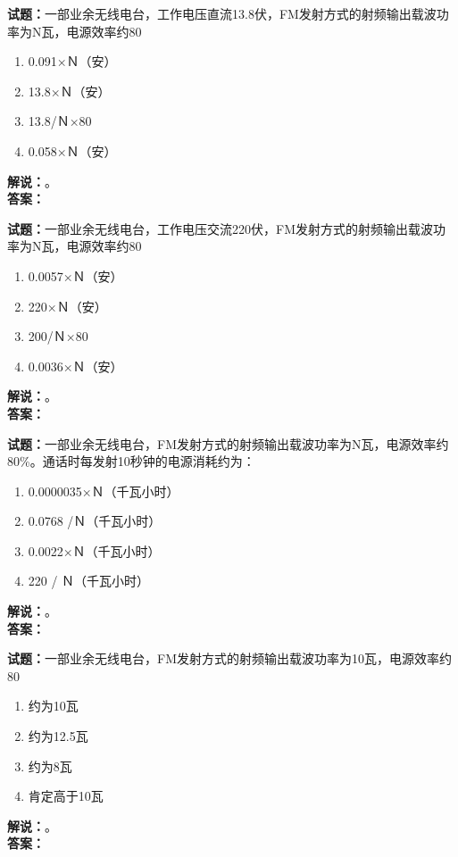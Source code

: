 \documentclass{ctexbook}
\begin{document}
\noindent\textbf{试题：}一部业余无线电台，工作电压直流13.8伏，FM发射方式的射频输出载波功率为N瓦，电源效率约80%
\begin{enumerate}[leftmargin=3em]
  \item 0.091×Ｎ（安）
  \item 13.8×Ｎ（安）
  \item 13.8/Ｎ×80%
  \item 0.058×Ｎ（安）
\end{enumerate}
\noindent\textbf{解说：}\textbf{}。\\\noindent\textbf{答案：}

\vspace{\baselineskip}

\noindent\textbf{试题：}一部业余无线电台，工作电压交流220伏，FM发射方式的射频输出载波功率为N瓦，电源效率约80%
\begin{enumerate}[leftmargin=3em]
  \item 0.0057×Ｎ（安）
  \item 220×Ｎ（安）
  \item 200/Ｎ×80%
  \item 0.0036×Ｎ（安）
\end{enumerate}
\noindent\textbf{解说：}\textbf{}。\\\noindent\textbf{答案：}

\vspace{\baselineskip}

\noindent\textbf{试题：}一部业余无线电台，FM发射方式的射频输出载波功率为N瓦，电源效率约80\%。通话时每发射10秒钟的电源消耗约为：
\begin{enumerate}[leftmargin=3em]
  \item 0.0000035×Ｎ（千瓦小时）
  \item 0.0768 /Ｎ（千瓦小时）
  \item 0.0022×Ｎ（千瓦小时）
  \item 220 / Ｎ（千瓦小时）
\end{enumerate}
\noindent\textbf{解说：}\textbf{}。\\\noindent\textbf{答案：}

\vspace{\baselineskip}

\noindent\textbf{试题：}一部业余无线电台，FM发射方式的射频输出载波功率为10瓦，电源效率约80%
\begin{enumerate}[leftmargin=3em]
  \item 约为10瓦
  \item 约为12.5瓦
  \item 约为8瓦
  \item 肯定高于10瓦
\end{enumerate}
\noindent\textbf{解说：}\textbf{}。\\\noindent\textbf{答案：}
\end{document}

